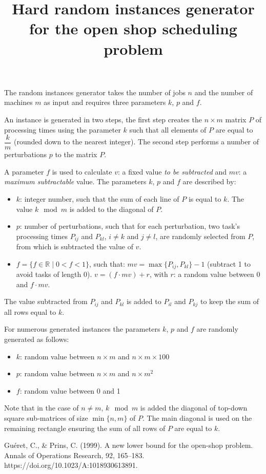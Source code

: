 \documentclass[fleqn,10pt]{article}
\title{Hard random instances generator for the open shop scheduling problem}   %
\begin{document}
\flushbottom
\maketitle
\thispagestyle{empty}

The random instances generator takes the number of jobs $n$ and the number of machines $m$ as input and requires three parameters $k$, $p$ and $f$.

An instance is generated in two steps, the first step creates the $ n \times m $ matrix $P$ of processing times using the parameter $k$ such that all elements of $P$ are equal to $\dfrac{k}{m}$ (rounded down to the nearest integer). The second step performs a number of perturbations $p$ to the matrix $P$.

A parameter $f$ is used to calculate $v$: a fixed value \textit{to be subtracted} and $mv$: a \textit{maximum subtractable} value. The parameters $k$, $p$ and $f$ are described by:

\begin{itemize}
    \item $k$: integer number, such that the sum of each line of $P$ is equal to $k$. The value $k \mod m$ is added to the diagonal of $P$. 
    
    \item $p$: number of perturbations, such that for each perturbation, two task's processing times $P_{ij}$ and $ P_{kl}$, $i \neq k $ and $j \neq l$, are randomly selected from $P$, from which is subtracted the value of $v$.
    
    \item $f=\{f \in \mathbb{R} \mid 0<f<1\}$, such that:
    \subitem $mv =  \max\{P_{ij},P_{kl}\}-1$ (subtract 1 to avoid tasks of length 0).      
    \subitem $v = (f \cdot mv) + r $, with $r$: a random value between $0$ and $f \cdot mv$. 
\end{itemize}

The value subtracted from $P_{ij}$ and $P_{kl}$ is added to $P_{il}$ and $P_{kj}$ to keep the sum of all rows equal to $k$.

For numerous generated instances the parameters $k$, $p$ and $f$ are randomly generated as follows:

\begin{itemize}
    \item $k$: random value between $ n \times m$ and $n \times m \times 100 $
    \item $p$: random value between $ n \times m$ and $ n \times m^{2} $
    \item $f$: random value between 0 and 1
\end{itemize}


Note that in the case of $n \neq m$, $k \mod m$ is added the diagonal of top-down square sub-matrices of size $\min\{n,m\}$ of $P$. The main diagonal is used on the remaining rectangle ensuring the sum of all rows of $P$ are equal to $k$. 

\begin{thebibliography}{1}
     Guéret, C., \& Prins, C. (1999). A new lower bound for the open-shop problem. Annals of Operations Research, 92, 165–183. https://doi.org/10.1023/A:1018930613891.

\end{thebibliography}
\end{document}
